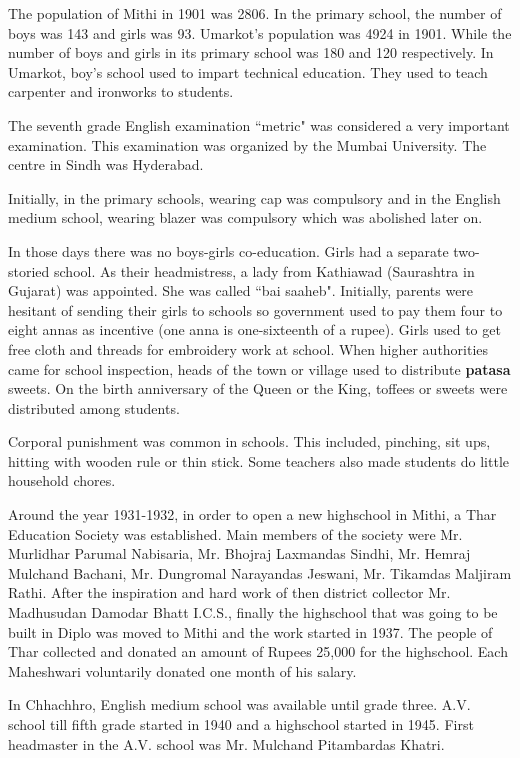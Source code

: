 The population of Mithi in 1901 was 2806. In the primary school, the number of
boys was 143 and girls was 93. Umarkot's population was 4924 in 1901. While the
number of boys and girls in its primary school was 180 and 120 respectively. In
Umarkot, boy's school used to impart technical education. They used to teach
carpenter and ironworks to students. 

The seventh grade English examination ``metric" was considered a very important
examination. This examination was organized by the Mumbai University. The centre
in Sindh was Hyderabad.

Initially, in the primary schools, wearing cap was compulsory and in the English
medium school, wearing blazer was compulsory which was abolished later on.

In those days there was no boys-girls co-education. Girls had a separate
two-storied school. As their headmistress, a lady from Kathiawad (Saurashtra in
Gujarat) was appointed. She was called ``bai saaheb". Initially, parents were
hesitant of sending their girls to schools so government used to pay them four
to eight annas as incentive (one anna is one-sixteenth of a rupee). Girls used
to get free cloth and threads for embroidery work at school. When higher
authorities came for school inspection, heads of the town or village used to
distribute \textbf{patasa} sweets. On the birth anniversary of the Queen or the
King, toffees or sweets were distributed among students.

Corporal punishment was common in schools. This included, pinching, sit ups,
hitting with wooden rule or thin stick. Some teachers also made students do
little household chores.

Around the year 1931-1932, in order to open a new highschool in Mithi, a Thar
Education Society was established. Main members of the society were Mr.
Murlidhar Parumal Nabisaria, Mr. Bhojraj Laxmandas Sindhi, Mr. Hemraj Mulchand
Bachani, Mr. Dungromal Narayandas Jeswani, Mr. Tikamdas Maljiram Rathi. After
the inspiration and hard work of then district collector Mr. Madhusudan Damodar
Bhatt I.C.S., finally the highschool that was going to be built in Diplo was
moved to Mithi and the work started in 1937. The people of Thar collected and
donated an amount of Rupees 25,000 for the highschool. Each Maheshwari
voluntarily donated one month of his salary.

In Chhachhro, English medium school was available until grade three. A.V. school
till fifth grade started in 1940 and a highschool started in 1945. First
headmaster in the A.V. school was Mr. Mulchand Pitambardas Khatri.

